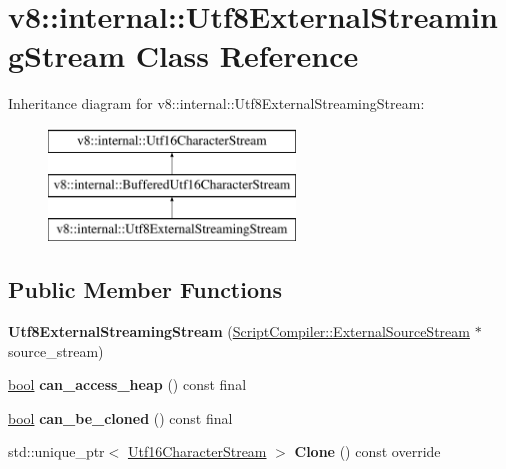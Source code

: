 \hypertarget{classv8_1_1internal_1_1Utf8ExternalStreamingStream}{}\section{v8\+:\+:internal\+:\+:Utf8\+External\+Streaming\+Stream Class Reference}
\label{classv8_1_1internal_1_1Utf8ExternalStreamingStream}
Inheritance diagram for v8\+:\+:internal\+:\+:Utf8\+External\+Streaming\+Stream\+:\begin{figure}[H]
\begin{center}
\leavevmode
\includegraphics[height=3.000000cm]{classv8_1_1internal_1_1Utf8ExternalStreamingStream}
\end{center}
\end{figure}
\subsection*{Public Member Functions}
\begin{DoxyCompactItemize}
\item 
\mbox{\label{classv8_1_1internal_1_1Utf8ExternalStreamingStream_a052a976278054666a889fe9ac795abc6}} 
{\bfseries Utf8\+External\+Streaming\+Stream} (\mbox{\hyperlink{classv8_1_1ScriptCompiler_1_1ExternalSourceStream}{Script\+Compiler\+::\+External\+Source\+Stream}} $\ast$source\+\_\+stream)
\item 
\mbox{\label{classv8_1_1internal_1_1Utf8ExternalStreamingStream_a631f225a096a1e664e8f53d340ec37df}} 
\mbox{\hyperlink{classbool}{bool}} {\bfseries can\+\_\+access\+\_\+heap} () const final
\item 
\mbox{\label{classv8_1_1internal_1_1Utf8ExternalStreamingStream_aff4947aefaac75a0303b3fce39240c75}} 
\mbox{\hyperlink{classbool}{bool}} {\bfseries can\+\_\+be\+\_\+cloned} () const final
\item 
\mbox{\label{classv8_1_1internal_1_1Utf8ExternalStreamingStream_aa2529a4887002ccce99d8c524f818d92}} 
std\+::unique\+\_\+ptr$<$ \mbox{\hyperlink{classv8_1_1internal_1_1Utf16CharacterStream}{Utf16\+Character\+Stream}} $>$ {\bfseries Clone} () const override
\end{DoxyCompactItemize}
